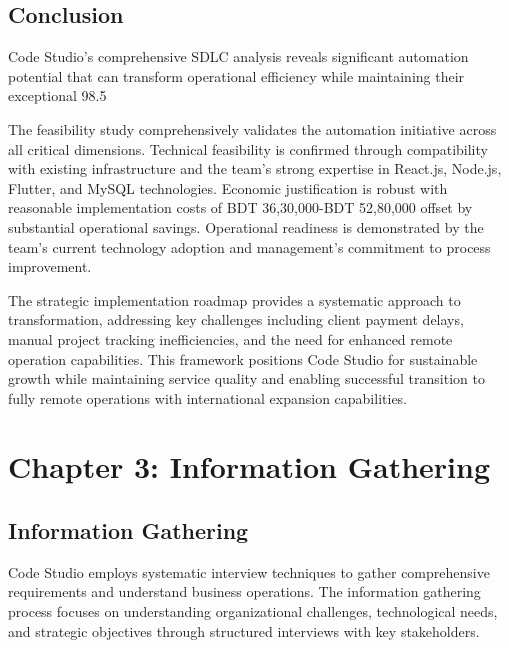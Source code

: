 \documentclass[12pt,a4paper]{article}
\begin{document}
\subsection{Conclusion}

Code Studio's comprehensive SDLC analysis reveals significant automation potential that can transform operational efficiency while maintaining their exceptional 98.5%

The feasibility study comprehensively validates the automation initiative across all critical dimensions. Technical feasibility is confirmed through compatibility with existing infrastructure and the team's strong expertise in React.js, Node.js, Flutter, and MySQL technologies. Economic justification is robust with reasonable implementation costs of BDT 36,30,000-BDT 52,80,000 offset by substantial operational savings. Operational readiness is demonstrated by the team's current technology adoption and management's commitment to process improvement.

The strategic implementation roadmap provides a systematic approach to transformation, addressing key challenges including client payment delays, manual project tracking inefficiencies, and the need for enhanced remote operation capabilities. This framework positions Code Studio for sustainable growth while maintaining service quality and enabling successful transition to fully remote operations with international expansion capabilities.

\newpage
\pagestyle{chapter3style}

\section{Chapter 3: Information Gathering}

\subsection{Information Gathering}

Code Studio employs systematic interview techniques to gather comprehensive requirements and understand business operations. The information gathering process focuses on understanding organizational challenges, technological needs, and strategic objectives through structured interviews with key stakeholders.
\end{document}
